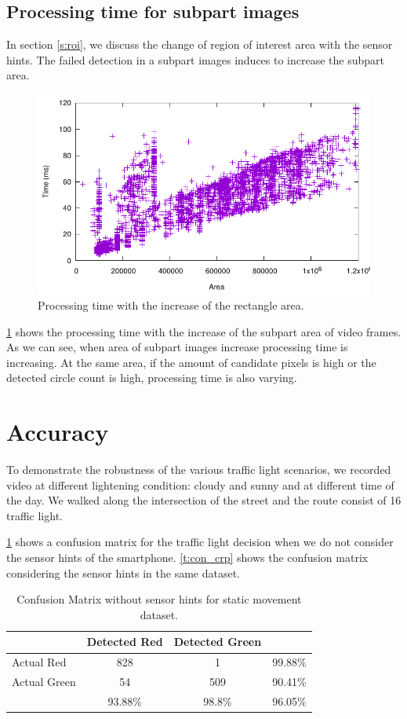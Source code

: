 \subsection{Processing time for subpart images}
In section \ref{s:roi}, we discuss the change of region of interest area with the sensor hints.
The failed detection in a subpart images induces to increase the subpart area. 

\begin{figure}[h!]
\centering
\includegraphics[width=5.2in]{plots/sunny_recarea.pdf}
\caption{Processing time with the increase of the rectangle area.}
\label{f:recarea}
\end{figure}
\ref{f:recarea} shows the processing time with the increase of the subpart area of video frames.
As we can see, when area of subpart images increase processing time is increasing.
At the same area, if the amount of candidate pixels is high or the detected circle count is high, processing time is also varying.

\section{Accuracy}
\label{s:acc}
To demonstrate the robustness of the various traffic light scenarios, we recorded video at different lightening condition: cloudy and sunny and at different time of the day.
We walked along the intersection of the street and the route consist of 16 traffic light.

\ref{t:con_nocrp} shows a confusion matrix for the traffic light decision when we do not consider the sensor hints of the smartphone.
\ref{t:con_crp} shows the confusion matrix considering the sensor hints in the same dataset.

\begin{table}[h!]
  \centering
  \caption{Confusion Matrix without sensor hints for static movement dataset.}
  \label{t:con_nocrp}
  \begin{tabular}{  l | c | c | r }
   
     & Detected Red & Detected Green &  \\
    \hline
    Actual Red & 828 & 1 & 99.88\% \\
    \hline
    Actual Green & 54 & 509 & 90.41\% \\
    \hline
    & 93.88\% & 98.8\% & 96.05\% \\
    
  \end{tabular}
\end{table}


